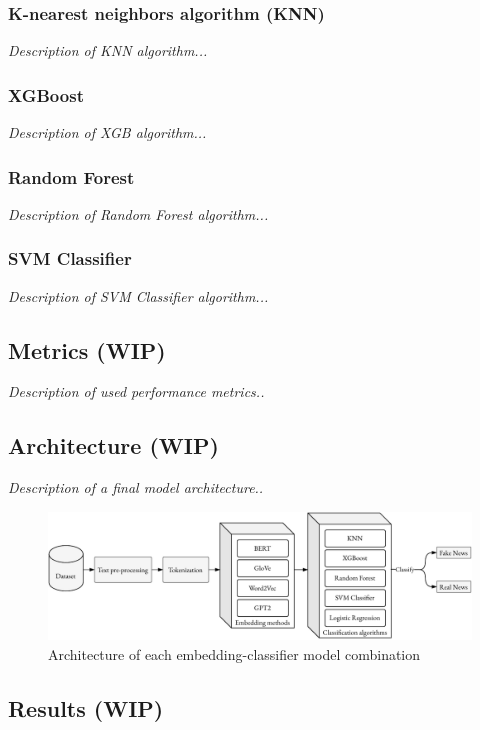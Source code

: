 \subsubsection{K-nearest neighbors algorithm (KNN)}
\textit{Description of KNN algorithm...}

\subsubsection{XGBoost}
\textit{Description of XGB algorithm...}

\subsubsection{Random Forest}
\textit{Description of Random Forest algorithm...}

\subsubsection{SVM Classifier}
\textit{Description of SVM Classifier algorithm...}


\subsection{Metrics (WIP)}
\textit{Description of used performance metrics..}


\subsection{Architecture (WIP)}
\textit{Description of a final model architecture..}

\begin{figure}
\centering
\includegraphics[width=0.8\linewidth]{methodology-schema_gpt2_extended.pdf}
\caption{Architecture of each embedding-classifier model combination}
\label{methodology-schema_extended}
\end{figure}


\subsection{Results (WIP)}

